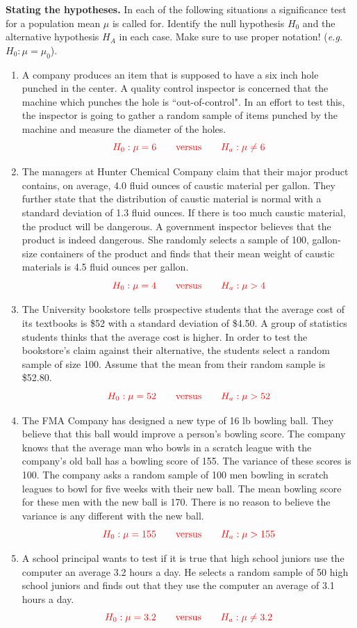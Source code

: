 \item  \textbf{Stating the hypotheses.} In each of the following situations a significance test for a population mean $\mu$ is called for.  Identify the null hypothesis $H_0$ and the alternative hypothesis $H_A$ in each case. Make sure to use proper notation! (\textit{e.g.\ $H_0: \mu = \mu_0$}).
	\begin{enumerate}
	\item  A company produces an item that is supposed to have a six inch hole punched in the center. A quality control inspector is concerned that the machine which punches the hole is ``out-of-control". In an effort to test this, the inspector is going to gather a random sample of items punched by the machine and measure the diameter of the holes.
$${\color{red} H_0: \mu = 6 \qquad \mbox{versus}  \qquad H_a: \mu \neq 6}$$

	\item  The managers at Hunter Chemical Company claim that their major product contains, on average, 4.0 fluid ounces of caustic material per gallon. They further state that the distribution of caustic material is normal with a standard deviation of 1.3 fluid ounces. If there is too much caustic material, the product will be dangerous. A government inspector believes that the product is indeed dangerous. She randomly selects a sample of 100, gallon-size containers of the product and finds that their mean weight of caustic materials is 4.5 fluid ounces per gallon.
$${\color{red} H_0: \mu = 4 \qquad \mbox{versus}  \qquad H_a: \mu > 4}$$

	\item  The University bookstore tells prospective students that the average cost of its textbooks is \$52 with a standard deviation of \$4.50. A group of statistics students thinks that the average cost is higher. In order to test the bookstore's claim against their alternative, the students select a random sample of size 100. Assume that the mean from their random sample is \$52.80. 
$${\color{red} H_0: \mu = 52 \qquad \mbox{versus}  \qquad  H_a: \mu > 52}$$
	
	\item  The FMA Company has designed a new type of 16 lb bowling ball. They believe that this ball would improve a person's bowling score. The company knows that the average man who bowls in a scratch league with the company's old ball has a bowling score of 155. The variance of these scores is 100. The company asks a random sample of 100 men bowling in scratch leagues to bowl for five weeks with their new ball. The mean bowling score for these men with the new ball is 170. There is no reason to believe the variance is any different with the new ball.
$${\color{red} H_0: \mu = 155 \qquad \mbox{versus}  \qquad  H_a: \mu > 155}$$
	
	\item  A school principal wants to test if it is true that high school juniors use the computer an average 3.2 hours a day. He selects a random sample of 50 high school juniors and finds out that they use the computer an average of 3.1 hours a day.
$${\color{red} H_0: \mu = 3.2 \qquad \mbox{versus}  \qquad  H_a: \mu \neq 3.2}$$
	\end{enumerate}